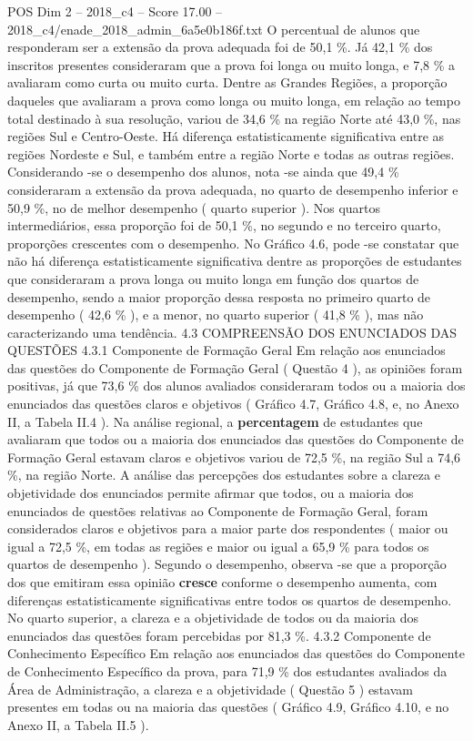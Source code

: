 \begin{textsample}{POS Dim 2 – 2018\_c4 – Score 17.00 – 2018\_c4/enade\_2018\_admin\_6a5e0b186f.txt}
O percentual de alunos que responderam ser a extensão da prova adequada foi de 50,1 \%.
Já 42,1 \% dos inscritos presentes consideraram que a prova foi longa ou muito longa, e 7,8 \% a avaliaram como curta ou muito curta.
Dentre as Grandes Regiões, a proporção daqueles que avaliaram a prova como longa ou muito longa, em relação ao tempo total destinado à sua resolução, variou de 34,6 \% na região Norte até 43,0 \%, nas regiões Sul e Centro-Oeste.
Há diferença estatisticamente significativa entre as regiões Nordeste e Sul, e também entre a região Norte e todas as outras regiões.
Considerando -se o desempenho dos alunos, nota -se ainda que 49,4 \% consideraram a extensão da prova adequada, no quarto de desempenho inferior e 50,9 \%, no de melhor desempenho ( quarto superior ).
Nos quartos intermediários, essa proporção foi de 50,1 \%, no segundo e no terceiro quarto, proporções crescentes com o desempenho.
No Gráfico 4.6, pode -se constatar que não há diferença estatisticamente significativa dentre as proporções de estudantes que consideraram a prova longa ou muito longa em função dos quartos de desempenho, sendo a maior proporção dessa resposta no primeiro quarto de desempenho ( 42,6 \% ), e a menor, no quarto superior ( 41,8 \% ), mas não caracterizando uma tendência. 4.3 COMPREENSÃO DOS ENUNCIADOS DAS QUESTÕES 4.3.1 Componente de Formação Geral Em relação aos enunciados das questões do Componente de Formação Geral ( Questão 4 ), as opiniões foram positivas, já que 73,6 \% dos alunos avaliados consideraram todos ou a maioria dos enunciados das questões claros e objetivos ( Gráfico 4.7, Gráfico 4.8, e, no Anexo II, a Tabela II.4 ).
Na análise regional, a \textbf{percentagem} de estudantes que avaliaram que todos ou a maioria dos enunciados das questões do Componente de Formação Geral estavam claros e objetivos variou de 72,5 \%, na região Sul a 74,6 \%, na região Norte.
A análise das percepções dos estudantes sobre a clareza e objetividade dos enunciados permite afirmar que todos, ou a maioria dos enunciados de questões relativas ao Componente de Formação Geral, foram considerados claros e objetivos para a maior parte dos respondentes ( maior ou igual a 72,5 \%, em todas as regiões e maior ou igual a 65,9 \% para todos os quartos de desempenho ).
Segundo o desempenho, observa -se que a proporção dos que emitiram essa opinião \textbf{cresce} conforme o desempenho aumenta, com diferenças estatisticamente significativas entre todos os quartos de desempenho.
No quarto superior, a clareza e a objetividade de todos ou da maioria dos enunciados das questões foram percebidas por 81,3 \%. 4.3.2 Componente de Conhecimento Específico Em relação aos enunciados das questões do Componente de Conhecimento Específico da prova, para 71,9 \% dos estudantes avaliados da Área de Administração, a clareza e a objetividade ( Questão 5 ) estavam presentes em todas ou na maioria das questões ( Gráfico 4.9, Gráfico 4.10, e no Anexo II, a Tabela II.5 ).

\end{textsample}
